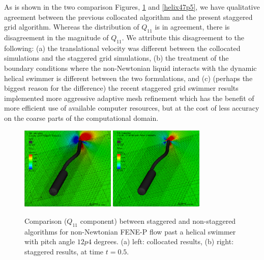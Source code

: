 \documentclass[]{article}
\begin{document}
As is shown in the two comparison Figures, \ref{helix12p4} and
\ref{helix47p5}, we have qualitative agreement between the
previous collocated algorithm and the present staggered grid
algorithm.  Whereas the distribution of $Q_{11}$ is in agreement,
there is disagreement in the magnitude of $Q_{11}$.  We 
attribute this disagreement to the following:
(a) the translational velocity was different between the collocated
simulations and the staggered grid simulations, 
(b) the treatment of the boundary conditions where the non-Newtonian
liquid interacts with the dynamic helical swimmer is different
between the two formulations, and (c) (perhaps the biggest
reason for the difference) the recent staggered grid swimmer results
implemented more aggressive adaptive mesh refinement which has
the benefit of more efficient use of available computer resources,
but at the cost of less accuracy on the coarse parts of the 
computational domain.

\begin{figure}[htpb]
\centering
\includegraphics[width=0.4\textwidth]{collocated_12p4.png}
\includegraphics[width=0.4\textwidth]{staggared_12p4.png}
\caption{Comparison ($Q_{11}$ component) between staggered and 
    	non-staggered algorithms for 
        non-Newtonian FENE-P flow past a helical swimmer with pitch angle
        $12p4$ degrees.
	(a) left: collocated results, (b) right: staggered results,
	at time $t=0.5$. \label{helix12p4} }
\end{figure}
\end{document}
